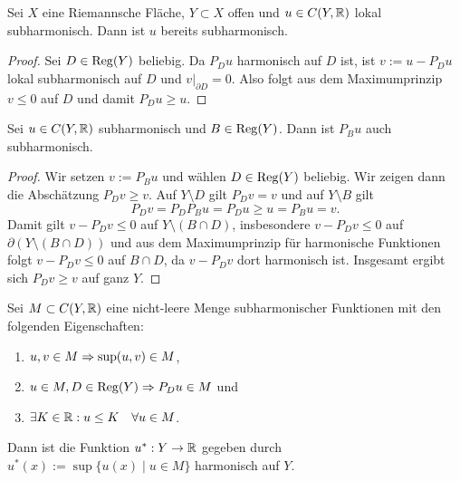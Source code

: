 \begin{cor}
  Sei $X$ eine Riemannsche Fläche, $Y\subset X$ offen und $u \in C(Y,
  \mathbb{R})$ lokal subharmonisch. Dann ist $u$ bereits subharmonisch.
\end{cor}

\begin{proof}
  Sei $D \in \operatorname{Reg}(Y)$ beliebig. Da $P_D u$ harmonisch auf $D$ ist, ist
  $v:= u- P_Du$ lokal subharmonisch auf $D$ und $v|_{\partial D}
  = 0$. Also folgt aus dem Maximumprinzip $v \leq0$ auf $D$ und
  damit $P_Du \geq u$.
\end{proof}

\begin{lemma}
  Sei $u \in C(Y, \mathbb{R})$ subharmonisch und $B \in \operatorname{Reg}(Y)$. Dann ist
  $P_B u$ auch subharmonisch.
\end{lemma}

\begin{proof}
  Wir setzen $v:= P_B u$ und wählen $D \in \operatorname{Reg}(Y)$ beliebig. Wir
  zeigen dann die Abschätzung $P_D v \geq v$. Auf $Y \setminus D$ gilt $P_Dv = v$
  und auf $Y\setminus B$ gilt
  \[
  P_Dv = P_DP_Bu = P_Du \geq u = P_Bu = v.
  \]
  Damit gilt $v - P_Dv \leq 0$ auf $Y \setminus (B \cap D)$,
  insbesondere $v- P_D v \leq 0$ auf $\partial (Y \setminus (B \cap
  D))$ und aus dem Maximumprinzip für harmonische Funktionen folgt $v
  - P_D v \leq 0$ auf $B \cap D$, da $v - P_D v$ dort harmonisch
  ist. Insgesamt ergibt sich $P_Dv \geq v$ auf ganz $Y$.
\end{proof}

\begin{lemma}[Perron]
  \label{lemma:perron}
  Sei $M \subset C(Y, \mathbb{R})$ eine nicht-leere Menge subharmonischer
  Funktionen mit den folgenden Eigenschaften:
  \begin{enumerate}
  \item $u,v \in M \Rightarrow \sup(u,v) \in M$,
  \item $u \in M, D \in \operatorname{Reg}(Y) \Rightarrow P_Du \in M$ und
  \item $\exists K \in \mathbb{R}: u \leq K \quad \forall u \in M$.
  \end{enumerate}
  Dann ist die Funktion $u^\ast : Y \rightarrow \mathbb{R}$ gegeben durch $u^\ast(x) :=
  \sup\{u(x) \mid u \in M \}$ harmonisch auf $Y$.
\end{lemma}


